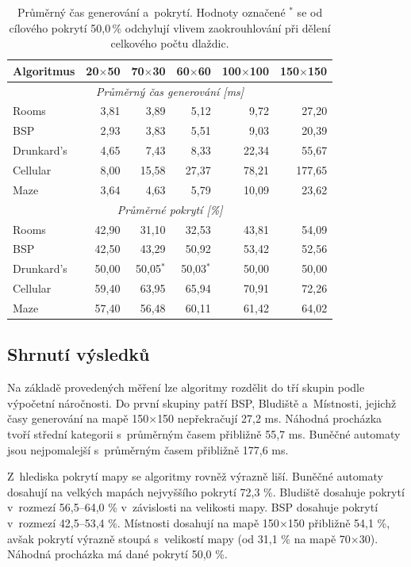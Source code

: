 \documentclass[
   program=itk,
   biblatex,
   figures=true,
   tables=true,
   glossaries,
   index
]{kidiplom}
\begin{document}
\begin{table}[H]
\centering
\small
\begin{tabular}{|l|r|r|r|r|r|}
\hline
\textbf{Algoritmus} & \textbf{20$\times$50} & \textbf{70$\times$30} & \textbf{60$\times$60} & \textbf{100$\times$100} & \textbf{150$\times$150} \\
\hline
\multicolumn{6}{|c|}{\textit{Průměrný čas generování [ms]}} \\
\hline
Rooms    & 3,81 & 3,89 & 5,12 & 9,72 & 27,20  \\
BSP      & 2,93 & 3,83 & 5,51 & 9,03 & 20,39  \\
Drunkard's  & 4,65 & 7,43  & 8,33 & 22,34 & 55,67  \\
Cellular & 8,00 & 15,58 & 27,37 & 78,21 & 177,65 \\
Maze     & 3,64 & 4,63 & 5,79 & 10,09 & 23,62  \\
\hline
\multicolumn{6}{|c|}{\textit{Průměrné pokrytí [\%]}} \\
\hline
Rooms    & 42,90 & 31,10 & 32,53 & 43,81 & 54,09 \\
BSP      & 42,50 & 43,29 & 50,92 & 53,42 & 52,56 \\
Drunkard's  & 50,00 & 50,05$^*$ & 50,03$^*$ & 50,00 & 50,00 \\
Cellular & 59,40 & 63,95 & 65,94 & 70,91 & 72,26 \\
Maze     & 57,40 & 56,48 & 60,11 & 61,42 & 64,02 \\
\hline
\end{tabular}
\caption{Průměrný čas generování a~pokrytí. Hodnoty označené $^*$ se od cílového pokrytí 50,0\,\% odchylují vlivem zaokrouhlování při dělení celkového počtu dlaždic.}
\label{tab:results_summary}
\end{table}


\subsection{Shrnutí výsledků}

Na základě provedených měření lze algoritmy rozdělit do tří skupin podle výpočetní náročnosti. Do první skupiny patří BSP, Bludiště a~Místnosti, jejichž časy generování na mapě 150$\times$150 nepřekračují 27,2 ms. Náhodná procházka tvoří střední kategorii s~průměrným časem přibližně 55,7 ms. Buněčné automaty jsou nejpomalejší s~průměrným časem přibližně 177,6 ms.

Z~hlediska pokrytí mapy se algoritmy rovněž výrazně liší. Buněčné automaty dosahují na velkých mapách nejvyššího pokrytí 72,3 \%. Bludiště dosahuje pokrytí v~rozmezí 56,5--64,0 \% v~závislosti na velikosti mapy. BSP dosahuje pokrytí v~rozmezí 42,5--53,4 \%. Místnosti dosahují na mapě 150$\times$150 přibližně 54,1 \%, avšak pokrytí výrazně stoupá s~velikostí mapy (od 31,1 \% na mapě 70$\times$30). Náhodná procházka má dané pokrytí 50,0 \%.
\end{document}
